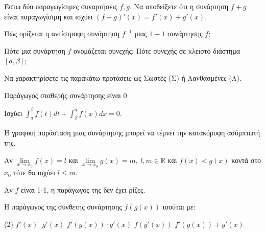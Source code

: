 \documentclass[11pt,a4paper]{article}
\newcommand{\kerkissans}[1]{{\fontfamily{maksf}\selectfont \textbf{#1}}}
\renewcommand{\textdexiakeraia}{}
\newcommand{\dint}{\displaystyle\int}
\newcommand\themanum{A}
\newcounter{thema}[section]
\renewcommand{\thethema}{\arabic{thema}}
\newcommand{\Thema}{\refstepcounter{thema}{\textbf{\textcolor{black}{\faPenSquare\ \  \large \kerkissans{\textbf{\thethemaο\hspace{2mm}Διαγώνισμα - Θέμα \themanum}}}}}\hspace{0mm}}{}
\newenvironment{thema}[1]
{\begin{tcolorbox}[title=\Thema\kerkissans{\textbf{\large{  #1}}},breakable,
enhanced standard,titlerule=0pt,toprule=0pt, rightrule=0pt, bottomrule=0pt,
colback=white,left=0mm,top=1mm,bottom=0mm,
boxrule=0pt,
colframe=white,leftrule=0mm,sharp corners,coltitle=black]
\renewcommand{\themanum}{#1}}
{\end{tcolorbox}}
\begin{document}
\begin{thema}{A}
\begin{erwthma}
    \item Έστω δύο παραγωγίσιμες συναρτήσεις $f, g$. Να αποδείξετε ότι η συνάρτηση $f+g$ είναι παραγωγίσιμη και ισχύει $(f+g)'(x) = f'(x) + g'(x)$.
    \item Πώς ορίζεται η αντίστροφη συνάρτηση $f^{-1}$ μιας $1-1$ συνάρτησης $f$;
    \item Πότε μια συνάρτηση $f$ ονομάζεται συνεχής; Πότε συνεχής σε κλειστό διάστημα $[a, \beta]$;
    \item Να χαρακτηρίσετε τις παρακάτω προτάσεις ως Σωστές (Σ) ή Λανθασμένες (Λ).
    \begin{alist}
        \item Παράγωγος σταθερής συνάρτησης είναι 0.
        \item Ισχύει $\dint_a^\beta f(t) dt + \dint_\beta^a f(x) dx = 0$.
        \item Η γραφική παράσταση μιας συνάρτησης μπορεί να τέμνει την κατακόρυφη ασύμπτωτή της.
        \item Αν $\lim\limits_{x\to x_0}{f(x)}=l$ και $\lim\limits_{x\to x_0}{g(x)}=m,\ l,m\in\mathbb{R}$ και $f(x)<g(x)$ κοντά στο $x_0$ τότε θα ισχύει $l\leq m$.
        \item Αν $f$ είναι 1-1, η παράγωγος της δεν έχει ρίζες.
    \end{alist}
    \item Η παράγωγος της σύνθετης συνάρτησης $f(g(x))$ ισούται με:
    \begin{tasks}[label=\let\textdexiakeraia\relax\alph*.](2)
        \task $f'(x) \cdot g'(x)$
        \task $f'(g(x)) \cdot g'(x)$
        \task $f(g'(x))$
        \task $f'(g(x)) + g'(x)$
    \end{tasks}
\end{erwthma}
\end{thema}
\vspace{1cm}
\end{document}

